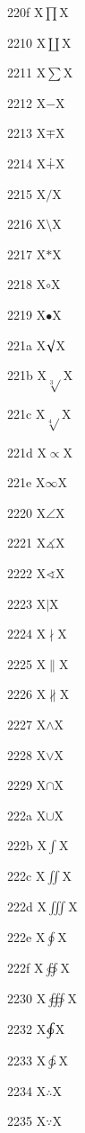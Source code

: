 \documentclass[11pt]{article}
\begin{document}
220f X{\ensuremath{\prod}}X

2210 X{\ensuremath{\coprod}}X

2211 X{\ensuremath{\sum}}X

2212 X{\ensuremath{-}}X

2213 X{\ensuremath{\mp}}X

2214 X{\ensuremath{\dotplus}}X

2215 X{\ensuremath{/}}X

2216 X{\ensuremath{\setminus}}X

2217 X{\ensuremath{\ast}}X

2218 X{\ensuremath{\circ}}X

2219 X{\ensuremath{\bullet}}X

221a X{\ensuremath{\surd}}X

221b X{\ensuremath{\sqrt[3]{}}}X

221c X{\ensuremath{\sqrt[4]{}}}X

221d X{\ensuremath{\propto}}X

221e X{\ensuremath{\infty}}X

2220 X{\ensuremath{\angle}}X

2221 X{\ensuremath{\measuredangle}}X

2222 X{\ensuremath{\sphericalangle}}X

2223 X{\ensuremath{\mid}}X

2224 X{\ensuremath{\nmid}}X

2225 X{\ensuremath{\parallel}}X

2226 X{\ensuremath{\nparallel}}X

2227 X{\ensuremath{\wedge}}X

2228 X{\ensuremath{\vee}}X

2229 X{\ensuremath{\cap}}X

222a X{\ensuremath{\cup}}X

222b X{\ensuremath{\int}}X

222c X{\ensuremath{\iint}}X

222d X{\ensuremath{\iiint}}X

222e X{\ensuremath{\oint}}X

222f X{\ensuremath{\oiint}}X

2230 X{\ensuremath{\oiiint}}X

2232 X{\ensuremath{\ointclockwise}}X

2233 X{\ensuremath{\ointctrclockwise}}X

2234 X{\ensuremath{\therefore}}X

2235 X{\ensuremath{\because}}X
\end{document}

